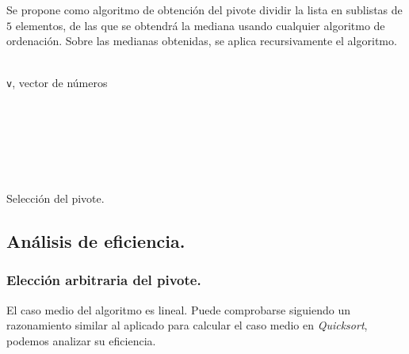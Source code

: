 \documentclass[a4paper, 11pt]{article} %
\begin{document}
    Se propone como algoritmo de obtención del pivote dividir la lista en sublistas de $5$ elementos, de las que se obtendrá
    la mediana usando cualquier algoritmo de ordenación. Sobre las medianas obtenidas, se aplica recursivamente el algoritmo.
    \begin{algorithm}[H]
      \begin{algorithmic}
	    \REQUIRE \ \\
	    \texttt{v}, vector de números \\\
	  
	     \\
	     \\
	  \ELSE
	     \\
	     \\
	  \ENDIF
      \end{algorithmic}
      \caption{Selección del pivote.}
      \label{median-of-medians}
    \end{algorithm}

  \subsection{Análisis de eficiencia.}
    \subsubsection{Elección arbitraria del pivote.}
      El caso medio del algoritmo es lineal. Puede comprobarse siguiendo un razonamiento similar al aplicado para 
      calcular el caso medio en \textit{Quicksort}, podemos analizar su eficiencia.
    
\end{document}
